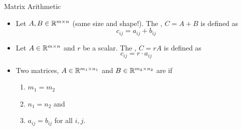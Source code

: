 \documentclass[xcoler=dvipsnames, aspectratio=169]{beamer}
\begin{document}
    \begin{frame}{Matrix Arithmetic}
        \begin{tcolorbox}
        \begin{itemize}
            \item Let $A,B\in\mathbb{R}^{m\times n}$ (same size and shape!). The , 
                $C = A+B$ is defined as
                \vspace{-5pt}
                \[
                    c_{ij} = a_{ij} + b_{ij}
                \]
                \vspace{-20pt}
                \pause
            \item Let $A\in\mathbb{R}^{m\times n}$ and $r$ be a scalar. The , 
                $C = rA$ is defined as 
                \vspace{-5pt}
                \[
                    c_{ij} = r\cdot a_{ij}
                \]
                \vspace{-20pt}
                \pause
            \item Two matrices, $A\in\mathbb{R}^{m_1\times n_1}$ and $B\in\mathbb{R}^{m_2\times n_2}$ are
                 if
                \begin{enumerate}
                    \item $m_1=m_2$\pause
                    \item $n_1=n_2$ and\pause
                    \item $a_{ij} = b_{ij}$ for all $i,j$.\pause
                \end{enumerate}
        \end{itemize}
        \end{tcolorbox}
    \end{frame}
\end{document}
